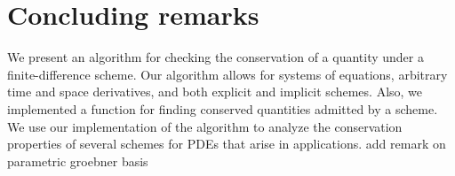 \documentclass[runningheads]{llncs}
\newcommand{\1}{\chi}
\begin{document}
\section{Concluding remarks}
We present an algorithm for checking the conservation of a quantity under a finite-difference scheme. Our algorithm allows for systems of equations, arbitrary time and space derivatives, and both explicit and implicit schemes. Also, we implemented a function for finding conserved quantities admitted by a scheme. We use our implementation of the algorithm to analyze the conservation properties of several schemes for PDEs that arise in applications. {\color{red} add remark on parametric groebner basis}




\end{document}
